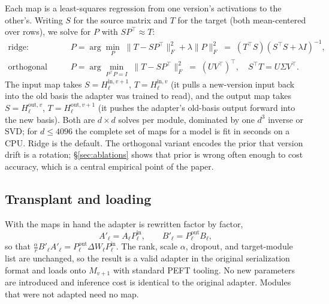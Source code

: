 Each map is a least-squares regression from one version's activations to the
other's. Writing $S$ for the source matrix and $T$ for the target (both
mean-centered over rows), we solve for $P$ with $S P^\top\approx T$:
\begin{align}
  \text{ridge:}\quad
    &P=\arg\min_P\;\lVert T-SP^\top\rVert_F^2+\lambda\lVert P\rVert_F^2
     \;=\;(T^\top S)(S^\top S+\lambda I)^{-1},
  \label{eq:ridge}\\
  \text{orthogonal (Procrustes):}\quad
    &P=\arg\min_{P^\top P=I}\;\lVert T-SP^\top\rVert_F^2
     \;=\;(UV^\top)^\top,\quad S^\top T=U\Sigma V^\top .
  \label{eq:procrustes_sol}
\end{align}
The input map takes $S=H^{\mathrm{in},v+1}_\ell$, $T=H^{\mathrm{in},v}_\ell$
(it pulls a new-version input back into the old basis the adapter was trained
to read), and the output map takes $S=H^{\mathrm{out},v}_\ell$,
$T=H^{\mathrm{out},v+1}_\ell$ (it pushes the adapter's old-basis output forward
into the new basis). Both are $d\times d$ solves per module, dominated by one
$d^3$ inverse or SVD; for $d\le 4096$ the complete set of maps for a model is
fit in seconds on a CPU. Ridge is the default. The orthogonal variant encodes
the prior that version drift is a rotation; \S\ref{sec:ablations} shows that
prior is wrong often enough to cost accuracy, which is a central empirical
point of the paper.

\subsection{Transplant and loading}
\label{sec:method:transplant}

With the maps in hand the adapter is rewritten factor by factor,
\[
  A'_\ell = A_\ell P^{\mathrm{in}}_\ell,\qquad
  B'_\ell = P^{\mathrm{out}}_\ell B_\ell,
\]
so that $\tfrac{\alpha}{r}B'_\ell A'_\ell=P^{\mathrm{out}}_\ell\Delta W_\ell
P^{\mathrm{in}}_\ell$. The rank, scale $\alpha$, dropout, and target-module
list are unchanged, so the result is a valid adapter in the original
serialization format and loads onto $M_{v+1}$ with standard PEFT tooling. No
new parameters are introduced and inference cost is identical to the original
adapter. Modules that were not adapted need no map.

